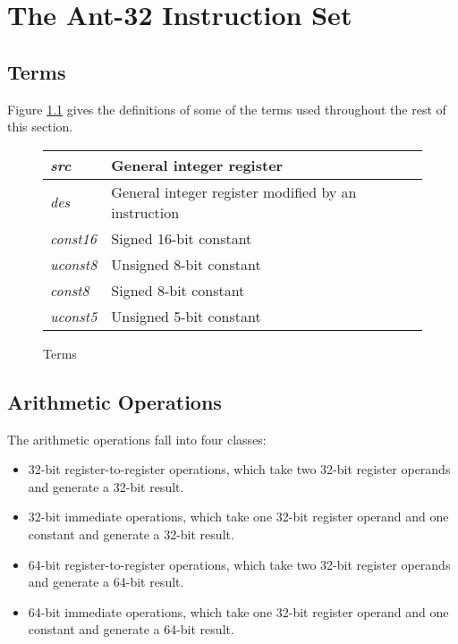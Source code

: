 
\chapter{The Ant-32 Instruction Set}
\label{ant32-inst}

\section{Terms}

Figure \ref{Terms} gives the definitions of some of the terms
used throughout the rest of this section.

\begin{figure}[ht]
\caption{\label{Terms} Terms}

\begin{center}
\begin{tabular}{|l|l|}
\hline

{\em src}	& General integer register \\
\hline

{\em des}	& General integer register modified by an instruction \\
\hline

{\em const16}	& Signed 16-bit constant \\
\hline

{\em uconst8}	& Unsigned 8-bit constant \\
\hline

{\em const8}	& Signed 8-bit constant \\
\hline

{\em uconst5}	& Unsigned 5-bit constant \\
\hline

\end{tabular}
\end{center}
\end{figure}

\section{Arithmetic Operations}

The arithmetic operations fall into four classes:

\begin{itemize}

\item 32-bit register-to-register operations, which take two 32-bit
	register operands and generate a 32-bit result.

\item 32-bit immediate operations, which take one 32-bit register
	operand and one constant and generate a 32-bit result.

\item 64-bit register-to-register operations, which take two 32-bit
	register operands and generate a 64-bit result.

\item 64-bit immediate operations, which take one 32-bit register
	operand and one constant and generate a 64-bit result.

\end{itemize}

